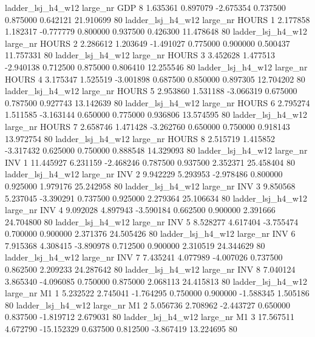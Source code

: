  ladder_lsj_h4_w12   large_nr      GDP                 8  1.635361  0.897079  -2.675354 0.737500 0.875000  0.642121   21.910699 80
  ladder_lsj_h4_w12   large_nr    HOURS                 1  2.177858  1.182317  -0.777779 0.800000 0.937500  0.426300   11.478648 80
  ladder_lsj_h4_w12   large_nr    HOURS                 2  2.286612  1.203649  -1.491027 0.775000 0.900000  0.500437   11.757331 80
  ladder_lsj_h4_w12   large_nr    HOURS                 3  3.452628  1.477513  -2.940138 0.712500 0.875000  0.806410   12.255546 80
  ladder_lsj_h4_w12   large_nr    HOURS                 4  3.175347  1.525519  -3.001898 0.687500 0.850000  0.897305   12.704202 80
  ladder_lsj_h4_w12   large_nr    HOURS                 5  2.953860  1.531188  -3.066319 0.675000 0.787500  0.927743   13.142639 80
  ladder_lsj_h4_w12   large_nr    HOURS                 6  2.795274  1.511585  -3.163144 0.650000 0.775000  0.936806   13.574595 80
  ladder_lsj_h4_w12   large_nr    HOURS                 7  2.658746  1.471428  -3.262760 0.650000 0.750000  0.918143   13.972754 80
  ladder_lsj_h4_w12   large_nr    HOURS                 8  2.515719  1.415852  -3.317432 0.625000 0.750000  0.888548   14.329093 80
  ladder_lsj_h4_w12   large_nr      INV                 1 11.445927  6.231159  -2.468246 0.787500 0.937500  2.352371   25.458404 80
  ladder_lsj_h4_w12   large_nr      INV                 2  9.942229  5.293953  -2.978486 0.800000 0.925000  1.979176   25.242958 80
  ladder_lsj_h4_w12   large_nr      INV                 3  9.850568  5.237045  -3.390291 0.737500 0.925000  2.279364   25.106634 80
  ladder_lsj_h4_w12   large_nr      INV                 4  9.092028  4.897943  -3.590184 0.662500 0.900000  2.391666   24.704800 80
  ladder_lsj_h4_w12   large_nr      INV                 5  8.528277  4.617404  -3.755474 0.700000 0.900000  2.371376   24.505426 80
  ladder_lsj_h4_w12   large_nr      INV                 6  7.915368  4.308415  -3.890978 0.712500 0.900000  2.310519   24.344629 80
  ladder_lsj_h4_w12   large_nr      INV                 7  7.435241  4.077989  -4.007026 0.737500 0.862500  2.209233   24.287642 80
  ladder_lsj_h4_w12   large_nr      INV                 8  7.040124  3.865340  -4.096085 0.750000 0.875000  2.068113   24.415813 80
  ladder_lsj_h4_w12   large_nr       M1                 1  5.232522  2.745041  -1.764295 0.750000 0.900000 -1.588345    1.505186 80
  ladder_lsj_h4_w12   large_nr       M1                 2  5.056736  2.708962  -2.443727 0.650000 0.837500 -1.819712    2.679031 80
  ladder_lsj_h4_w12   large_nr       M1                 3 17.567511  4.672790 -15.152329 0.637500 0.812500 -3.867419   13.224695 80
